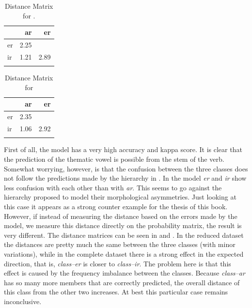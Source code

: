 \begin{table}
    
    \centering
    \begin{tabular}{lrr}
      \lsptoprule
      & ar   & er   \\
      \midrule
      er & 2.25 &      \\
      ir & 1.21 & 2.89 \\
      \lspbottomrule
    \end{tabular}
    \caption{Distance Matrix for . \hfill}
    \label{tab:spanish-verbs-theme-dist}

\end{table}

\begin{table}
    
    \centering
    \begin{tabular}{lrr}
      \lsptoprule
      & ar       & er       \\
      \midrule
      er & 2.35&\\
      ir & 1.06& 2.92\\
      \lspbottomrule
    \end{tabular}\caption{Distance Matrix for }
    \label{tab:spanish-verbs-theme-dist-2}
\end{table}
 

First of all, the model has a very high accuracy and kappa score. It is clear that the prediction of the thematic vowel is possible from the stem of the verb. Somewhat worrying, however, is that the confusion between the three classes does not follow the predictions made by the hierarchy in . In the model \textit{er} and \textit{ir} show less confusion with each other than with \textit{ar}. This seems to go against the hierarchy proposed to model their morphological asymmetries. Just looking at this case it appears as a strong counter example for the thesis of this book. 
However, if instead of measuring the distance based on the errors made by the model, we measure this distance directly on the probability matrix, the result is very different. The distance matrices can be seen in  and . In the reduced dataset the distances are pretty much the same between the three classes (with minor variations), while in the complete dataset there is a strong effect in the expected direction, that is, \textit{class--er} is closer to \textit{class--ir}. The problem here is that this effect is caused by the frequency imbalance between the classes. Because \textit{class--ar} has so many more members that are correctly predicted, the overall distance of this class from the other two increases. At best this particular case remains inconclusive.
 
